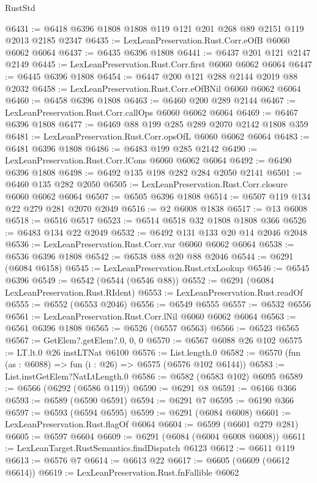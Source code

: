 \begin{lexlean}{RustStd}
\begin{coremodule}
@6431 := @6418 @6396 @1808 @1808 @119 @121 @201 @268 @89 @2151 @119 @2013 @2185 @2347
@6435 := LexLeanPreservation.Rust.Corr.eOfB @6060 @6062 @6064
@6437 := @6435 @6396 @1808
@6441 := @6437 @201 @121 @2147 @2149
@6445 := LexLeanPreservation.Rust.Corr.first @6060 @6062 @6064
@6447 := @6445 @6396 @1808
@6454 := @6447 @200 @121 @288 @2144 @2019 @88 @2032
@6458 := LexLeanPreservation.Rust.Corr.eOfBNil @6060 @6062 @6064
@6460 := @6458 @6396 @1808
@6463 := @6460 @200 @289 @2144
@6467 := LexLeanPreservation.Rust.Corr.callOps @6060 @6062 @6064
@6469 := @6467 @6396 @1808
@6477 := @6469 @88 @199 @285 @289 @2070 @2142 @1808 @359
@6481 := LexLeanPreservation.Rust.Corr.opsOfL @6060 @6062 @6064
@6483 := @6481 @6396 @1808
@6486 := @6483 @199 @285 @2142
@6490 := LexLeanPreservation.Rust.Corr.lCons @6060 @6062 @6064
@6492 := @6490 @6396 @1808
@6498 := @6492 @135 @198 @282 @284 @2050 @2141
@6501 := @6460 @135 @282 @2050
@6505 := LexLeanPreservation.Rust.Corr.closure @6060 @6062 @6064
@6507 := @6505 @6396 @1808
@6514 := @6507 @119 @134 @22 @279 @281 @2070 @2049
@6516 := @2 @6008 @1838
@6517 := @13 @6008
@6518 := @6516 @6517
@6523 := @6514 @6518 @32 @1808 @1808 @366
@6526 := @6483 @134 @22 @2049
@6532 := @6492 @131 @133 @20 @14 @2046 @2048
@6536 := LexLeanPreservation.Rust.Corr.var @6060 @6062 @6064
@6538 := @6536 @6396 @1808
@6542 := @6538 @88 @20 @88 @2046
@6544 := @6291 (@6084 @6158)
@6545 := LexLeanPreservation.Rust.ctxLookup
@6546 := @6545 @6396
@6549 := @6542 (@6544 (@6546 @88))
@6552 := @6291 (@6084 LexLeanPreservation.Rust.RIdent)
@6553 := LexLeanPreservation.Rust.readOf
@6555 := @6552 (@6553 @2046)
@6556 := @6549 @6555
@6557 := @6532 @6556
@6561 := LexLeanPreservation.Rust.Corr.lNil @6060 @6062 @6064
@6563 := @6561 @6396 @1808
@6565 := @6526 (@6557 @6563)
@6566 := @6523 @6565
@6567 := GetElem?.getElem?.{0, 0, 0}
@6570 := @6567 @6088 @26 @102
@6575 := LT.lt.{0} @26 instLTNat @6100
@6576 := List.length.{0}
@6582 := @6570 (fun (as : @6088) => fun (i : @26) => @6575 (@6576 @102 @6144))
@6583 := List.instGetElem?NatLtLength.{0}
@6586 := @6582 (@6583 @102) @6095
@6589 := @6566 (@6292 (@6586 @119))
@6590 := @6291 @8
@6591 := @6166 @366
@6593 := @6589 (@6590 @6591)
@6594 := @6291 @7
@6595 := @6190 @366
@6597 := @6593 (@6594 @6595)
@6599 := @6291 (@6084 @6008)
@6601 := LexLeanPreservation.Rust.flagOf @6064
@6604 := @6599 (@6601 @279 @281)
@6605 := @6597 @6604
@6609 := @6291 (@6084 (@6004 @6008 @6008))
@6611 := LexLeanTarget.RustSemantics.findDispatch @6123
@6612 := @6611 @119
@6613 := @6576 @7
@6614 := @6613 @22
@6617 := @6605 (@6609 (@6612 @6614))
@6619 := LexLeanPreservation.Rust.fnFallible @6062

\end{coremodule}
\end{lexlean}
